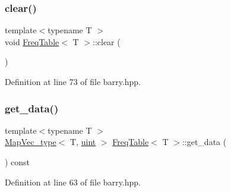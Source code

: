 \mbox{\label{classbarry_1_1_freq_table_a326660096e4309780aea8355d0f74ac7}} 
\subsubsection{\texorpdfstring{clear()}{clear()}}
{\footnotesize\ttfamily template$<$typename T $>$ \\
void \hyperlink{classbarry_1_1_freq_table}{Freq\+Table}$<$ T $>$\+::clear (\begin{DoxyParamCaption}{ }\end{DoxyParamCaption})\hspace{0.3cm}{\ttfamily [inline]}}



Definition at line 73 of file barry.\+hpp.

\mbox{\label{classbarry_1_1_freq_table_a7b99496d1c2f4193654752856b30d1a5}} 
\subsubsection{\texorpdfstring{get\+\_\+data()}{get\_data()}}
{\footnotesize\ttfamily template$<$typename T $>$ \\
\hyperlink{namespacebarry_a2f0d3aab1d67e4c8eaeab9022e16139f}{Map\+Vec\+\_\+type}$<$ T, \hyperlink{namespacebarry_a11dfc53ddb4672278319aa04f1e09a6c}{uint} $>$ \hyperlink{classbarry_1_1_freq_table}{Freq\+Table}$<$ T $>$\+::get\+\_\+data (\begin{DoxyParamCaption}{ }\end{DoxyParamCaption}) const\hspace{0.3cm}{\ttfamily [inline]}}



Definition at line 63 of file barry.\+hpp.

\mbox{\label{classbarry_1_1_freq_table_ab5dd6677f52072c93d18b2b9a3369ae7}} 
